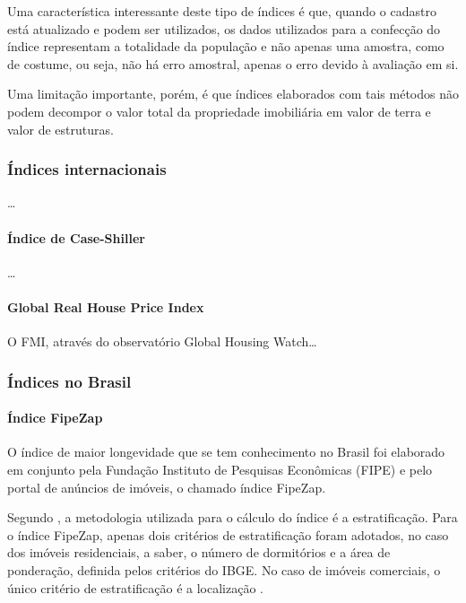 \documentclass[
	12pt,				%
	oneside,			%
	a4paper,			%
	chapter=TITLE,		%
	section=TITLE,		%
	english,			%
	brazil				%
	]{abntex2}
\begin{document}
Uma característica interessante deste tipo de índices é que, quando o
cadastro está atualizado e podem ser utilizados, os dados utilizados
para a confecção do índice representam a totalidade da população e não
apenas uma amostra, como de costume, ou seja, não há erro amostral,
apenas o erro devido à avaliação em si.

Uma limitação importante, porém, é que índices elaborados com tais
métodos não podem decompor o valor total da propriedade imobiliária em
valor de terra e valor de estruturas.

\subsubsection{Índices internacionais}\label{uxedndices-internacionais}

\ldots{}

\paragraph{Índice de Case-Shiller}\label{uxedndice-de-case-shiller}

\ldots{}

\paragraph{Global Real House Price
Index}\label{global-real-house-price-index}

O FMI, através do observatório Global Housing Watch\ldots{}

\subsubsection{Índices no Brasil}\label{uxedndices-no-brasil}

\paragraph{Índice FipeZap}\label{uxedndice-fipezap}

O índice de maior longevidade que se tem conhecimento no Brasil foi
elaborado em conjunto pela Fundação Instituto de Pesquisas Econômicas
(FIPE) e pelo portal de anúncios de imóveis, o chamado índice FipeZap.

Segundo \textcite{fipezap}, a metodologia utilizada para o cálculo do
índice é a estratificação. Para o índice FipeZap, apenas dois critérios
de estratificação foram adotados, no caso dos imóveis residenciais, a
saber, o número de dormitórios e a área de ponderação, definida pelos
critérios do IBGE. No caso de imóveis comerciais, o único critério de
estratificação é a localização \autocite[7]{fipezap}.
\end{document}
